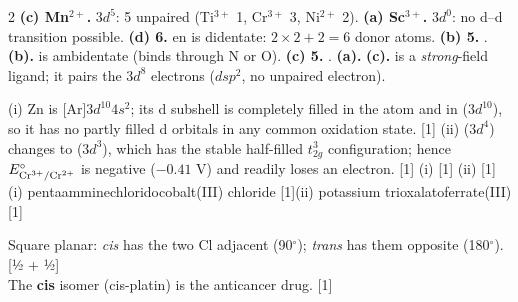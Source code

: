 \documentclass[10pt,a4paper]{extarticle}
\newcommand{\mk}[1]{{\scriptsize\color{black!55}[#1]}}
\begin{document}
\answerstart
\begin{multicols}{2}\raggedcolumns
{}
\An \textbf{(c) Mn$^{2+}$.} $3d^5$: 5 unpaired (Ti$^{3+}$ 1, Cr$^{3+}$ 3, Ni$^{2+}$ 2).
\An \textbf{(a) Sc$^{3+}$.} $3d^0$: no d--d transition possible.
\An \textbf{(d) 6.} en is didentate: $2\times2+2=6$ donor atoms.
\An \textbf{(b) 5.} .
\An \textbf{(b).}  is ambidentate (binds through N or O).
\An \textbf{(c) 5.} .
\An \textbf{(a).}
\An \textbf{(c).}  is a \emph{strong}-field ligand; it pairs the $3d^8$ electrons ($dsp^2$, no unpaired electron).

\An (i) Zn is [Ar]$3d^{10}4s^2$; its d subshell is completely filled in the atom and in  ($3d^{10}$), so it has no partly filled d orbitals in any common oxidation state. \mk{1}\nl
(ii)  ($3d^4$) changes to  ($3d^3$), which has the stable half-filled $t_{2g}^3$ configuration; hence $E^\circ_{\ce{Cr^3+/Cr^2+}}$ is negative ($-0.41$ V) and  readily loses an electron. \mk{1}
\An (i)  \mk{1}\nl
(ii)  \mk{1}
\An (i) pentaamminechloridocobalt(III) chloride \mk{1}\nl (ii) potassium trioxalatoferrate(III) \mk{1}
\An \begin{minipage}[t]{0.5\linewidth}\vspace{0pt}
\end{minipage}\hfill
\begin{minipage}[t]{0.46\linewidth}\vspace{0pt}
Square planar: \emph{cis} has the two Cl adjacent (90$^\circ$); \emph{trans} has them opposite (180$^\circ$). \mk{½ + ½}\\
The \textbf{cis} isomer (cis-platin) is the anticancer drug. \mk{1}
\end{minipage}


\end{multicols}
\end{document}

